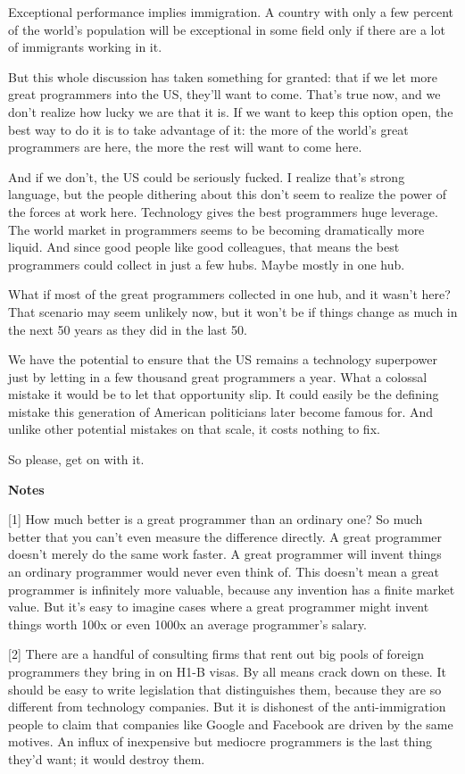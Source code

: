 Exceptional performance implies immigration. A country with only a few
percent of the world's population will be exceptional in some field only
if there are a lot of immigrants working in it.

But this whole discussion has taken something for granted: that if we
let more great programmers into the US, they'll want to come. That's
true now, and we don't realize how lucky we are that it is. If we want
to keep this option open, the best way to do it is to take advantage of
it: the more of the world's great programmers are here, the more the
rest will want to come here.

And if we don't, the US could be seriously fucked. I realize that's
strong language, but the people dithering about this don't seem to
realize the power of the forces at work here. Technology gives the best
programmers huge leverage. The world market in programmers seems to be
becoming dramatically more liquid. And since good people like good
colleagues, that means the best programmers could collect in just a few
hubs. Maybe mostly in one hub.

What if most of the great programmers collected in one hub, and it
wasn't here? That scenario may seem unlikely now, but it won't be if
things change as much in the next 50 years as they did in the last 50.

We have the potential to ensure that the US remains a technology
superpower just by letting in a few thousand great programmers a year.
What a colossal mistake it would be to let that opportunity slip. It
could easily be the defining mistake this generation of American
politicians later become famous for. And unlike other potential mistakes
on that scale, it costs nothing to fix.

So please, get on with it.

\textbf{Notes}

{[}1{]} How much better is a great programmer than an ordinary one? So
much better that you can't even measure the difference directly. A great
programmer doesn't merely do the same work faster. A great programmer
will invent things an ordinary programmer would never even think of.
This doesn't mean a great programmer is infinitely more valuable,
because any invention has a finite market value. But it's easy to
imagine cases where a great programmer might invent things worth 100x or
even 1000x an average programmer's salary.

{[}2{]} There are a handful of consulting firms that rent out big pools
of foreign programmers they bring in on H1-B visas. By all means crack
down on these. It should be easy to write legislation that distinguishes
them, because they are so different from technology companies. But it is
dishonest of the anti-immigration people to claim that companies like
Google and Facebook are driven by the same motives. An influx of
inexpensive but mediocre programmers is the last thing they'd want; it
would destroy them.

